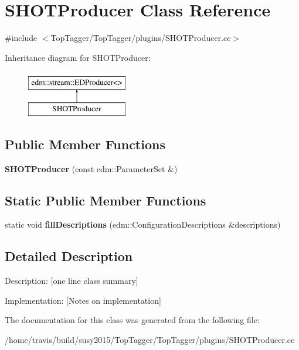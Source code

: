 \hypertarget{classSHOTProducer}{\section{S\-H\-O\-T\-Producer Class Reference}
\label{classSHOTProducer}
}


{\ttfamily \#include $<$Top\-Tagger/\-Top\-Tagger/plugins/\-S\-H\-O\-T\-Producer.\-cc$>$}

Inheritance diagram for S\-H\-O\-T\-Producer\-:\begin{figure}[H]
\begin{center}
\leavevmode
\includegraphics[height=2.000000cm]{classSHOTProducer}
\end{center}
\end{figure}
\subsection*{Public Member Functions}
\begin{DoxyCompactItemize}
\item 
\hypertarget{classSHOTProducer_a13653983741e35b0b7641672b25dec62}{{\bfseries S\-H\-O\-T\-Producer} (const edm\-::\-Parameter\-Set \&)}\label{classSHOTProducer_a13653983741e35b0b7641672b25dec62}

\end{DoxyCompactItemize}
\subsection*{Static Public Member Functions}
\begin{DoxyCompactItemize}
\item 
\hypertarget{classSHOTProducer_a2c8ce076825b6da1d56ad3fc51fbf55b}{static void {\bfseries fill\-Descriptions} (edm\-::\-Configuration\-Descriptions \&descriptions)}\label{classSHOTProducer_a2c8ce076825b6da1d56ad3fc51fbf55b}

\end{DoxyCompactItemize}


\subsection{Detailed Description}
Description\-: \mbox{[}one line class summary\mbox{]}

Implementation\-: \mbox{[}Notes on implementation\mbox{]} 

The documentation for this class was generated from the following file\-:\begin{DoxyCompactItemize}
\item 
/home/travis/build/susy2015/\-Top\-Tagger/\-Top\-Tagger/plugins/S\-H\-O\-T\-Producer.\-cc\end{DoxyCompactItemize}

